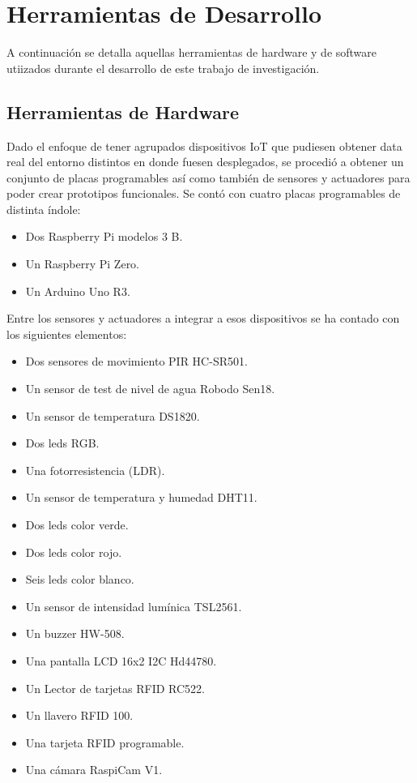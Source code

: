 \section{Herramientas de Desarrollo}
A continuación se detalla aquellas herramientas de hardware y de software utiizados durante el desarrollo de este trabajo de investigación.

\subsection{Herramientas de Hardware}
Dado el enfoque de tener agrupados dispositivos IoT que pudiesen obtener data real del entorno distintos en donde fuesen desplegados, se procedió a obtener un conjunto de placas programables así como también de sensores y actuadores para poder crear prototipos funcionales. Se contó con cuatro placas programables de distinta índole:
\begin{itemize}
\item Dos Raspberry Pi modelos 3 B.
\item Un Raspberry Pi Zero.
\item Un Arduino Uno R3.
\end{itemize}

Entre los sensores y actuadores a integrar a esos dispositivos se ha contado con los siguientes elementos:
\begin{itemize}
\item Dos sensores de movimiento PIR HC-SR501.
\item Un sensor de test de nivel de agua Robodo Sen18.
\item Un sensor de temperatura DS1820.
\item Dos leds RGB.
\item Una fotorresistencia (LDR).
\item Un sensor de temperatura y humedad DHT11.
\item Dos leds color verde.
\item Dos leds color rojo.
\item Seis leds color blanco.
\item Un sensor de intensidad lumínica TSL2561.
\item Un buzzer HW-508.
\item Una pantalla LCD 16x2 I2C Hd44780.
\item Un Lector de tarjetas RFID RC522.
\item Un llavero RFID 100.
\item Una tarjeta RFID programable. 
\item Una cámara RaspiCam V1.  
\end{itemize}

